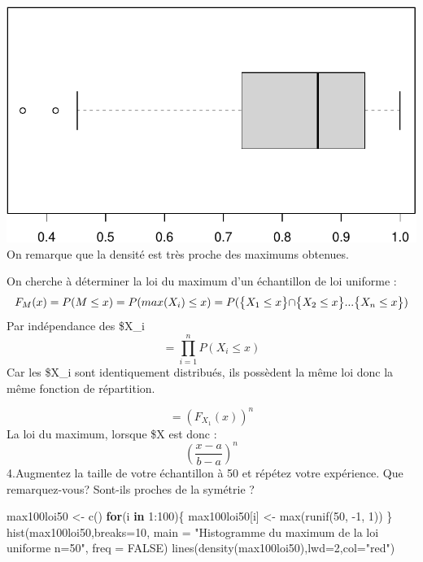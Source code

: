 \documentclass[
]{article}
\newenvironment{Shaded}{\begin{snugshade}}{\end{snugshade}}
\newcommand{\AttributeTok}[1]{\textcolor[rgb]{0.77,0.63,0.00}{#1}}
\newcommand{\ConstantTok}[1]{\textcolor[rgb]{0.00,0.00,0.00}{#1}}
\newcommand{\ControlFlowTok}[1]{\textcolor[rgb]{0.13,0.29,0.53}{\textbf{#1}}}
\newcommand{\DecValTok}[1]{\textcolor[rgb]{0.00,0.00,0.81}{#1}}
\newcommand{\FunctionTok}[1]{\textcolor[rgb]{0.00,0.00,0.00}{#1}}
\newcommand{\NormalTok}[1]{#1}
\newcommand{\OtherTok}[1]{\textcolor[rgb]{0.56,0.35,0.01}{#1}}
\newcommand{\SpecialCharTok}[1]{\textcolor[rgb]{0.00,0.00,0.00}{#1}}
\newcommand{\StringTok}[1]{\textcolor[rgb]{0.31,0.60,0.02}{#1}}
\begin{document}
\includegraphics{tp2_files/figure-latex/unnamed-chunk-5-2.pdf} On
remarque que la densité est très proche des maximums obtenues.

On cherche à déterminer la loi du maximum d'un échantillon de loi
uniforme : \[
F_M(x) = P(M \le x) = P(max(X_i) \le x) 
\\
= P(\bigl\{X_1 \le x \bigl\} \cap \bigl\{ X_2 \le x\bigl\} ... \bigl\{ X_n \le x\bigl\})
\] Par indépendance des \$X\_i \[
 = \prod_{i=1}^n P(X_i \le x)
\] Car les \$X\_i sont identiquement distribués, ils possèdent la même
loi donc la même fonction de répartition.

\[
= (F_{X_1}(x))^n
\] La loi du maximum, lorsque \$X \in [a;b] est donc : \[
(\frac{x-a}{b-a})^n
\] 4.Augmentez la taille de votre échantillon à 50 et répétez votre
expérience. Que remarquez-vous? Sont-ils proches de la symétrie ?

\begin{Shaded}
\begin{Highlighting}[]
\NormalTok{max100loi50 }\OtherTok{\textless{}{-}} \FunctionTok{c}\NormalTok{()}
\ControlFlowTok{for}\NormalTok{(i }\ControlFlowTok{in} \DecValTok{1}\SpecialCharTok{:}\DecValTok{100}\NormalTok{)\{}
\NormalTok{  max100loi50[i] }\OtherTok{\textless{}{-}} \FunctionTok{max}\NormalTok{(}\FunctionTok{runif}\NormalTok{(}\DecValTok{50}\NormalTok{, }\SpecialCharTok{{-}}\DecValTok{1}\NormalTok{, }\DecValTok{1}\NormalTok{))}
\NormalTok{\}}
\FunctionTok{hist}\NormalTok{(max100loi50,}\AttributeTok{breaks=}\DecValTok{10}\NormalTok{, }\AttributeTok{main =} \StringTok{"Histogramme du maximum de la loi uniforme n=50"}\NormalTok{, }\AttributeTok{freq =} \ConstantTok{FALSE}\NormalTok{)}
\FunctionTok{lines}\NormalTok{(}\FunctionTok{density}\NormalTok{(max100loi50),}\AttributeTok{lwd=}\DecValTok{2}\NormalTok{,}\AttributeTok{col=}\StringTok{"red"}\NormalTok{)}
\end{Highlighting}
\end{Shaded}
\end{document}

